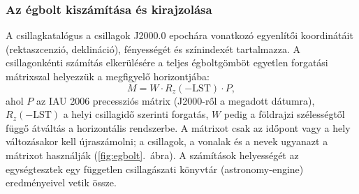 \documentclass[12pt,a4paper]{article}
\begin{document}
\subsubsection*{Az égbolt kiszámítása és kirajzolása}

A csillagkatalógus a csillagok J2000.0 epochára vonatkozó egyenlítői koordinátáit (rektaszcenzió,
deklináció), fényességét és színindexét tartalmazza. A csillagonkénti számítás elkerülésére a
teljes égboltgömböt egyetlen forgatási mátrixszal helyezzük a megfigyelő horizontjába:
\[
  M = W \cdot R_z(-\mathrm{LST}) \cdot P ,
\]
ahol $P$ az IAU 2006 precessziós mátrix (J2000-ről a megadott dátumra), $R_z(-\mathrm{LST})$ a
helyi csillagidő szerinti forgatás, $W$ pedig a földrajzi szélességtől függő átváltás a
horizontális rendszerbe. A mátrixot csak az időpont vagy a hely változásakor kell újraszámolni; a
csillagok, a vonalak és a nevek ugyanazt a mátrixot használják (\ref{fig:egbolt}.~ábra). A
számítások helyességét az egységtesztek egy független csillagászati könyvtár (astronomy-engine)
eredményeivel vetik össze.
\end{document}
